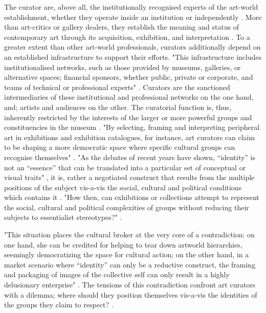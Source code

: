 The curator are, above all, the institutionally recognised experts of the art-world establishment, whether they operate inside an institution or independently \autocite[p. 22]{Thi_book}. More than art-critics or gallery dealers, they establish the meaning and status of contemporary art through its acquisition, exhibition, and interpretation \autocite[p. 22]{Thi_book}. To a greater extent than other art-world professionals, curators additionally depend on an established infrastructure to support their efforts. "This infrastructure includes institutionalised networks, such as those provided by museums, galleries, or alternative spaces; financial sponsors, whether public, private or corporate, and teams of technical or professional experts" \autocite[p. 22]{Thi_book}. Curators are the sanctioned intermediaries of these institutional and professional networks on the one hand, and; artists and audiences on the other. The curatorial function is, thus, inherently restricted by the interests of the larger or more powerful groups and constituencies in the museum \autocite[p. 22]{Thi_book}. "By selecting, framing and interpreting peripheral art in exhibitions and exhibition catalogues, for instance, art curators can claim to be shaping a more democratic space where specific cultural groups can recognise themselves" \autocite[p. 23]{Thi_book}. "As the debates of recent years have shown, “identity” is not an “essence” that can be translated into a particular set of conceptual or visual traits" \autocite{Miekebal_book}, it is, rather a negotiated construct that results from the multiple positions of the subject vis-a-vis the social, cultural and political conditions which contains it \autocite[p. 23]{Thi_book}. "How then, can exhibitions or collections attempt to represent the social, cultural and political complexities of groups without reducing their subjects to essentialist stereotypes?" \autocite[p. 23]{Thi_book}.

"This situation places the cultural broker at the very core of a contradiction: on one hand, she can be credited for helping to tear down artworld hierarchies, seemingly democratizing the space for cultural action; on the other hand, in a market scenario where “identity” can only be a reductive construct, the framing and packaging of images of the collective self can only result in a highly delusionary enterprise" \autocite[p. 23-24]{Thi_book}. The tensions of this contradiction confront art curators with a dilemma; where should they position themselves vis-a-vis the identities of the groups they claim to respect? \autocite[p. 24]{Thi_book}.

